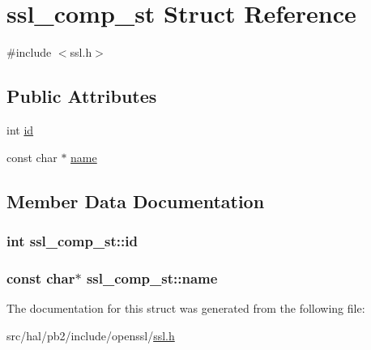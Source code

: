 \hypertarget{structssl__comp__st}{}\section{ssl\+\_\+comp\+\_\+st Struct Reference}
\label{structssl__comp__st}


{\ttfamily \#include $<$ssl.\+h$>$}

\subsection*{Public Attributes}
\begin{DoxyCompactItemize}
\item 
int \hyperlink{structssl__comp__st_aa0289c534fa9807fd873d0586c5e49aa}{id}
\item 
const char $\ast$ \hyperlink{structssl__comp__st_a5f5f77d06eefedaaa25bab3779a37c7b}{name}
\end{DoxyCompactItemize}


\subsection{Member Data Documentation}
\subsubsection[{\texorpdfstring{id}{id}}]{\setlength{\rightskip}{0pt plus 5cm}int ssl\+\_\+comp\+\_\+st\+::id}\hypertarget{structssl__comp__st_aa0289c534fa9807fd873d0586c5e49aa}{}\label{structssl__comp__st_aa0289c534fa9807fd873d0586c5e49aa}
\subsubsection[{\texorpdfstring{name}{name}}]{\setlength{\rightskip}{0pt plus 5cm}const char$\ast$ ssl\+\_\+comp\+\_\+st\+::name}\hypertarget{structssl__comp__st_a5f5f77d06eefedaaa25bab3779a37c7b}{}\label{structssl__comp__st_a5f5f77d06eefedaaa25bab3779a37c7b}


The documentation for this struct was generated from the following file\+:\begin{DoxyCompactItemize}
\item 
src/hal/pb2/include/openssl/\hyperlink{ssl_8h}{ssl.\+h}\end{DoxyCompactItemize}
